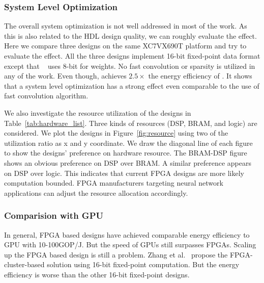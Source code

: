 \subsubsection*{\textbf{System Level Optimization}} The overall system optimization is not well addressed in most of the work. As this is also related to the HDL design quality, we can roughly evaluate the effect. Here we compare three designs\cite{zhang2016caffeine, liu2016automatic, li2016high} on the same XC7VX690T platform and try to evaluate the effect. All the three designs implement 16-bit fixed-point data format except that ~\cite{liu2016automatic} uses 8-bit for weights. No fast convolution or sparsity is utilized in any of the work. Even though, \cite{li2016high} achieves $2.5\times$ the energy efficiency of \cite{liu2016automatic}. It shows that a system level optimization has a strong effect even comparable to the use of fast convolution algorithm. 

We also investigate the resource utilization of the designs in Table~\ref{tab:hardware_list}. Three kinds of resources (DSP, BRAM, and logic) are considered. We plot the designs in Figure~\ref{fig:resource} using two of the utilization ratio as x and y coordinate. We draw the diagonal line of each figure to show the designs' preference on hardware resource. The BRAM-DSP figure shows an obvious preference on DSP over BRAM. A similar preference appears on DSP over logic. This indicates that current FPGA designs are more likely computation bounded. FPGA manufacturers targeting neural network applications can adjust the resource allocation accordingly.

\subsubsection*{\textbf{Comparision with GPU}} In general, FPGA based designs have achieved comparable energy efficiency to GPU with 10-100GOP/J. But the speed of GPUs still surpasses FPGAs. Scaling up the FPGA based design is still a problem. Zhang et al.~\cite{zhang2016energy} propose the FPGA-cluster-based solution using 16-bit fixed-point computation. But the energy efficiency is worse than the other 16-bit fixed-point designs. 

